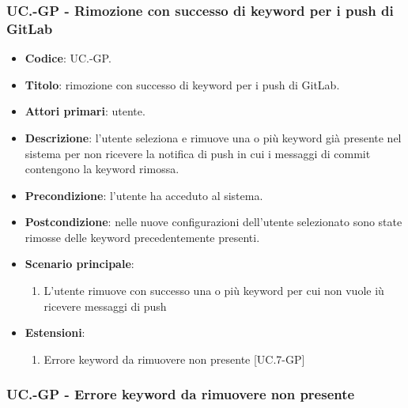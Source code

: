 	\subsubsection{UC\theuccount.\thesubuccount-GP - Rimozione con successo di keyword per i push di GitLab}

	\begin{itemize}
		\item \textbf{Codice}: UC\theuccount.\thesubuccount-GP.
		\item \textbf{Titolo}: rimozione con successo di keyword per i push di GitLab.
		\item \textbf{Attori primari}: utente.
		\item \textbf{Descrizione}: l’utente seleziona e rimuove una o più keyword già presente nel sistema per non ricevere la notifica di push in
		cui i messaggi di commit contengono la keyword rimossa.
		\item \textbf{Precondizione}:  l’utente ha acceduto al sistema.
		\item \textbf{Postcondizione}: nelle nuove configurazioni dell'utente selezionato sono state rimosse delle keyword precedentemente presenti.
		\item \textbf{Scenario principale}:
		\begin{enumerate}
			\item L'utente rimuove con successo una o più keyword per cui non vuole iù ricevere messaggi di push
		\end{enumerate}
		\item \textbf{Estensioni}:
		\begin{enumerate}
			\item Errore keyword da rimuovere non presente [UC\theuccount.7-GP]
		\end{enumerate}
	\end{itemize}
	
	\subsubsection{UC\theuccount.\thesubuccount-GP - Errore keyword da rimuovere non presente}
	
